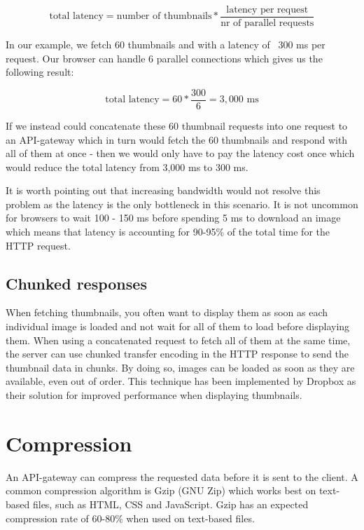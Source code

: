 \documentclass{cslthse-msc}
\begin{document}
\begin{equation}
\mbox{total latency} = \mbox{number of thumbnails} * \frac{\mbox{latency per request}}{\mbox{nr of parallel requests}}
\end{equation}

In our example, we fetch 60 thumbnails and with a latency of ~300 ms per request. Our browser can handle 6 parallel connections which gives us the following result:

\begin{equation}
\mbox{total latency} = 60 * \frac{300}{6} = 3,000 \mbox{ ms}
\end{equation}

If we instead could concatenate these 60 thumbnail requests into one request to an API-gateway which in turn would fetch the 60 thumbnails and respond with all of them at once - then we would only have to pay the latency cost once which would reduce the total latency from 3,000 ms to 300 ms.

It is worth pointing out that increasing bandwidth would not resolve this problem as the latency is the only bottleneck in this scenario. It is not uncommon for browsers to wait 100 - 150 ms before spending 5 ms to download an image which means that latency is accounting for 90-95\% of the total time for the HTTP request\cite{latency}.

\subsection{Chunked responses}
When fetching thumbnails, you often want to display them as soon as each individual image is loaded and not wait for all of them to load before displaying them. When using a concatenated request to fetch all of them at the same time, the server can use chunked transfer encoding in the HTTP response to send the thumbnail data in chunks\cite{chunked}. By doing so, images can be loaded as soon as they are available, even out of order. This technique has been implemented by Dropbox as their solution for improved performance when displaying thumbnails\cite{dropbox_chunked}.

\section{Compression}

An API-gateway can compress the requested data before it is sent to the client. A common compression algorithm is Gzip (GNU Zip) which works best on text-based files, such as HTML, CSS and JavaScript. Gzip has an expected compression rate of 60-80\% when used on text-based files\cite[p. 237]{HPBN}.
\end{document}
